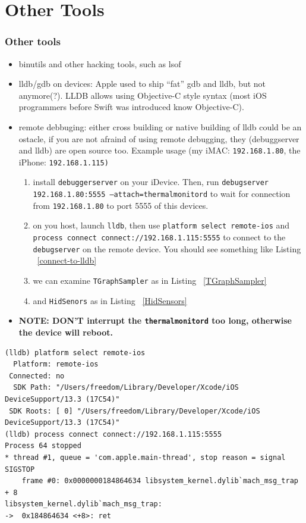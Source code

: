 \documentclass{beamer}
\begin{document}
\section{Other Tools}
\begin{frame}
  \frametitle{Other tools}
  \begin{itemize}
  \item binutils and other hacking tools, such as lsof
  \item lldb/gdb on devices: Apple used to ship ``fat'' gdb and lldb, but not anymore(?). LLDB allows using Objective-C style syntax (most iOS programmers before Swift was introduced know Objective-C).
  \item remote debbuging: either cross building or native building of lldb could be an ostacle, if you are not afraind of using remote debugging, they (debuggserver and lldb) are open source too. Example usage (my iMAC: \texttt{192.168.1.80}, the iPhone: \texttt{192.168.1.115)}
    \begin{enumerate}
    \item install \texttt{debuggerserver} on your iDevice. Then, run \texttt{debugserver 192.168.1.80:5555 --attach=thermalmonitord} to wait for connection from \texttt{192.168.1.80} to port 5555 of this devices.
    \item on you host, launch \texttt{lldb}, then use \texttt{platform select remote-ios} and \texttt{process connect connect://192.168.1.115:5555} to connect to the \texttt{debugserver} on the remote device. You should see something like Listing ~\ref{connect-to-lldb}
    \item we can examine \texttt{TGraphSampler} as in Listing ~\ref{TGraphSampler}
    \item and \texttt{HidSenors} as in Listing ~\ref{HidSensors}
    \end{enumerate}
    \item \textbf{NOTE: DON'T interrupt the \texttt{thermalmonitord} too long, otherwise the device will reboot.}
  \end{itemize}
  
  \tiny  
  \begin{lstlisting}[basicstyle=\tiny,caption={connect to debugserver from lldb},label={connect-to-lldb}]
(lldb) platform select remote-ios
  Platform: remote-ios
 Connected: no
  SDK Path: "/Users/freedom/Library/Developer/Xcode/iOS DeviceSupport/13.3 (17C54)"
 SDK Roots: [ 0] "/Users/freedom/Library/Developer/Xcode/iOS DeviceSupport/13.3 (17C54)"
(lldb) process connect connect://192.168.1.115:5555
Process 64 stopped
* thread #1, queue = 'com.apple.main-thread', stop reason = signal SIGSTOP
    frame #0: 0x0000000184864634 libsystem_kernel.dylib`mach_msg_trap + 8
libsystem_kernel.dylib`mach_msg_trap:
->  0x184864634 <+8>: ret    


\end{lstlisting}
\end{frame}
\end{document}
